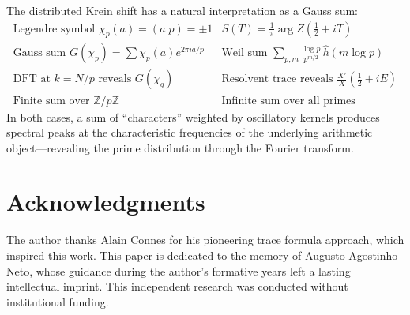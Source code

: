 \documentclass{pre-aomart}
\def\zeta{Z}%
\def\xi{X}%
\theoremstyle{plain}
\theoremstyle{definition}
\theoremstyle{remark}
\begin{document}
The distributed Krein shift has a natural interpretation as a Gauss sum:
\[
\begin{array}{c|c}
\text{Legendre symbol } \chi_p(a) = (a|p) = \pm 1 &
  S(T) = \frac{1}{\pi}\arg\zeta(\tfrac12 + iT) \\[2pt]
\text{Gauss sum } G(\chi_p) = \sum \chi_p(a)e^{2\pi i a/p} &
  \text{Weil sum } \sum_{p,m} \frac{\log p}{p^{m/2}}\,\hat h(m\log p) \\[2pt]
\text{DFT at } k = N/p \text{ reveals } G(\chi_q) &
  \text{Resolvent trace reveals } \frac{\xi'}{\xi}(\tfrac12 + iE) \\[2pt]
\text{Finite sum over } \mathbb{Z}/p\mathbb{Z} &
  \text{Infinite sum over all primes}
\end{array}
\]
In both cases, a sum of ``characters'' weighted by oscillatory kernels
produces spectral peaks at the characteristic frequencies of the underlying
arithmetic object---revealing the prime distribution through the Fourier
transform.

\section*{Acknowledgments}

The author thanks Alain Connes for his pioneering trace formula approach,
which inspired this work.  This paper is dedicated to the memory of
Augusto Agostinho Neto, whose guidance during the author's formative years
left a lasting intellectual imprint.  This independent research was
conducted without institutional funding.

\vspace{0.5em}
\end{document}
